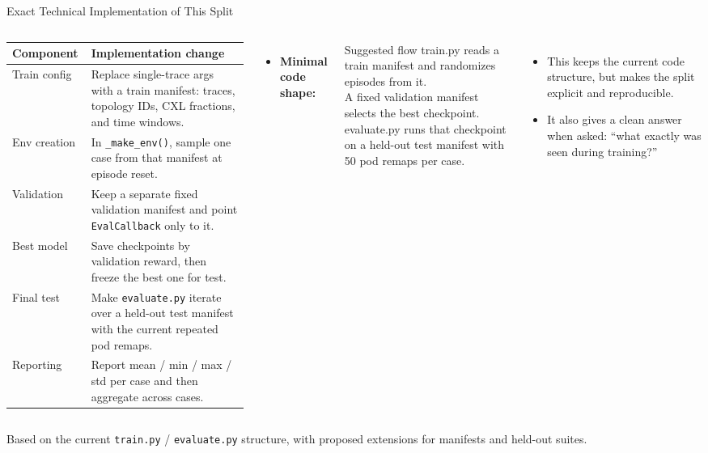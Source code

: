 \documentclass[10pt,aspectratio=169]{beamer}
\begin{document}
\begin{frame}{Exact Technical Implementation of This Split}
  \begin{columns}[T,onlytextwidth]
      \scriptsize
      \begin{tabular}{p{0.27\linewidth}p{0.65\linewidth}}
        \toprule
        \textbf{Component} & \textbf{Implementation change} \\
        \midrule
        Train config & Replace single-trace args with a train manifest: traces, topology IDs, CXL fractions, and time windows. \\
        Env creation & In \texttt{\_make\_env()}, sample one case from that manifest at episode reset. \\
        Validation & Keep a separate fixed validation manifest and point \texttt{EvalCallback} only to it. \\
        Best model & Save checkpoints by validation reward, then freeze the best one for test. \\
        Final test & Make \texttt{evaluate.py} iterate over a held-out test manifest with the current repeated pod remaps. \\
        Reporting & Report mean / min / max / std per case and then aggregate across cases. \\
        \bottomrule
      \end{tabular}
      \begin{itemize}
        \item \textbf{Minimal code shape:}
      \end{itemize}
      \begin{block}{Suggested flow}
        \scriptsize
        train.py reads a train manifest and randomizes episodes from it.\\[0.3em]
        A fixed validation manifest selects the best checkpoint.\\[0.3em]
        evaluate.py runs that checkpoint on a held-out test manifest with 50 pod remaps per case.
      \end{block}
      \begin{itemize}
        \item This keeps the current code structure, but makes the split explicit and reproducible.
        \item It also gives a clean answer when asked: ``what exactly was seen during training?''
      \end{itemize}
  \end{columns}

  \vspace{0.2em}
  {\tiny Based on the current \texttt{train.py} / \texttt{evaluate.py} structure, with proposed extensions for manifests and held-out suites.}
\end{frame}
\end{document}
